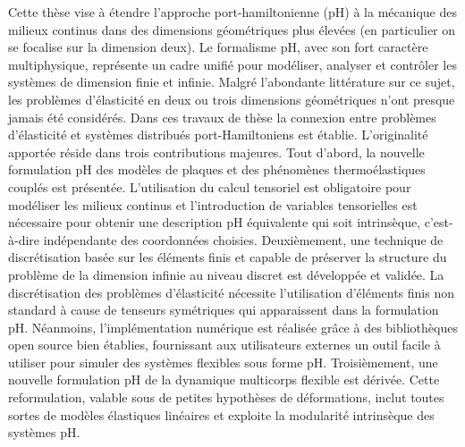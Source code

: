 \documentclass{article}
\begin{document}
Cette thèse vise à étendre l'approche port-hamiltonienne (pH) à la mécanique des milieux continus dans des dimensions géométriques plus élevées (en particulier on se focalise sur la dimension deux). Le formalisme pH, avec son fort caractère multiphysique, représente un cadre unifié pour modéliser, analyser et contrôler les systèmes de dimension finie et infinie. Malgré l'abondante littérature sur ce sujet, les problèmes d'élasticité en deux ou trois dimensions géométriques n'ont presque jamais été considérés. Dans ces travaux de thèse la connexion entre problèmes d'élasticité et systèmes distribués port-Hamiltoniens est établie. L'originalité apportée réside dans trois contributions majeures. Tout d'abord, la nouvelle formulation pH des modèles de plaques et des phénomènes thermoélastiques couplés est présentée. L'utilisation du calcul tensoriel est obligatoire pour modéliser les milieux  continus et l'introduction de variables tensorielles est nécessaire pour obtenir une description pH équivalente qui soit intrinsèque, c'est-à-dire indépendante des coordonnées choisies. Deuxièmement, une technique de discrétisation basée sur les éléments finis et capable de préserver la structure du problème de la dimension infinie au niveau discret est développée et validée. La discrétisation des problèmes d'élasticité nécessite l'utilisation d'éléments finis non standard à cause de tenseurs symétriques qui apparaissent dans la formulation pH. Néanmoins, l'implémentation numérique est réalisée grâce à des bibliothèques open source bien établies, fournissant aux utilisateurs externes un outil facile à utiliser pour simuler des systèmes flexibles sous forme pH. Troisièmement, une nouvelle formulation pH de la dynamique multicorps flexible est dérivée. Cette reformulation, valable sous de petites hypothèses de déformations, inclut toutes sortes de modèles élastiques linéaires et exploite la modularité intrinsèque des systèmes pH.
\end{document}
